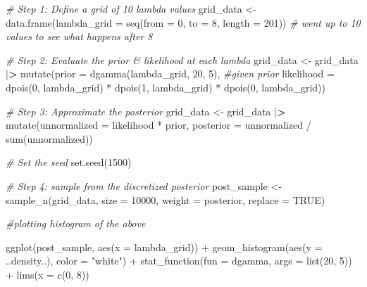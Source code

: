 \documentclass[
]{article}
\newenvironment{Shaded}{\begin{snugshade}}{\end{snugshade}}
\newcommand{\AttributeTok}[1]{\textcolor[rgb]{0.77,0.63,0.00}{#1}}
\newcommand{\CommentTok}[1]{\textcolor[rgb]{0.56,0.35,0.01}{\textit{#1}}}
\newcommand{\ConstantTok}[1]{\textcolor[rgb]{0.00,0.00,0.00}{#1}}
\newcommand{\DecValTok}[1]{\textcolor[rgb]{0.00,0.00,0.81}{#1}}
\newcommand{\ErrorTok}[1]{\textcolor[rgb]{0.64,0.00,0.00}{\textbf{#1}}}
\newcommand{\FunctionTok}[1]{\textcolor[rgb]{0.00,0.00,0.00}{#1}}
\newcommand{\NormalTok}[1]{#1}
\newcommand{\OtherTok}[1]{\textcolor[rgb]{0.56,0.35,0.01}{#1}}
\newcommand{\SpecialCharTok}[1]{\textcolor[rgb]{0.00,0.00,0.00}{#1}}
\newcommand{\StringTok}[1]{\textcolor[rgb]{0.31,0.60,0.02}{#1}}
\begin{document}
\begin{Shaded}
\begin{Highlighting}[]
\CommentTok{\# Step 1: Define a grid of 10 lambda values}
\NormalTok{grid\_data   }\OtherTok{\textless{}{-}} \FunctionTok{data.frame}\NormalTok{(}\AttributeTok{lambda\_grid =} \FunctionTok{seq}\NormalTok{(}\AttributeTok{from =} \DecValTok{0}\NormalTok{, }\AttributeTok{to =} \DecValTok{8}\NormalTok{, }\AttributeTok{length =} \DecValTok{201}\NormalTok{)) }\CommentTok{\# went up to 10 values to see what happens after 8}

\CommentTok{\# Step 2: Evaluate the prior \& likelihood at each lambda}
\NormalTok{grid\_data }\OtherTok{\textless{}{-}}\NormalTok{ grid\_data }\SpecialCharTok{|}\ErrorTok{\textgreater{}} 
  \FunctionTok{mutate}\NormalTok{(}\AttributeTok{prior =} \FunctionTok{dgamma}\NormalTok{(lambda\_grid, }\DecValTok{20}\NormalTok{, }\DecValTok{5}\NormalTok{), }\CommentTok{\#given prior}
         \AttributeTok{likelihood =} \FunctionTok{dpois}\NormalTok{(}\DecValTok{0}\NormalTok{, lambda\_grid) }\SpecialCharTok{*} \FunctionTok{dpois}\NormalTok{(}\DecValTok{1}\NormalTok{, lambda\_grid) }\SpecialCharTok{*} \FunctionTok{dpois}\NormalTok{(}\DecValTok{0}\NormalTok{, lambda\_grid))}

\CommentTok{\# Step 3: Approximate the posterior}
\NormalTok{grid\_data }\OtherTok{\textless{}{-}}\NormalTok{ grid\_data }\SpecialCharTok{|}\ErrorTok{\textgreater{}} 
  \FunctionTok{mutate}\NormalTok{(}\AttributeTok{unnormalized =}\NormalTok{ likelihood }\SpecialCharTok{*}\NormalTok{ prior,}
         \AttributeTok{posterior =}\NormalTok{ unnormalized }\SpecialCharTok{/} \FunctionTok{sum}\NormalTok{(unnormalized))}

\CommentTok{\# Set the seed}
\FunctionTok{set.seed}\NormalTok{(}\DecValTok{1500}\NormalTok{)}

\CommentTok{\# Step 4: sample from the discretized posterior}
\NormalTok{post\_sample }\OtherTok{\textless{}{-}} \FunctionTok{sample\_n}\NormalTok{(grid\_data, }\AttributeTok{size =} \DecValTok{10000}\NormalTok{, }
                        \AttributeTok{weight =}\NormalTok{ posterior, }\AttributeTok{replace =} \ConstantTok{TRUE}\NormalTok{)}

\CommentTok{\#plotting histogram of the above }

\FunctionTok{ggplot}\NormalTok{(post\_sample, }\FunctionTok{aes}\NormalTok{(}\AttributeTok{x =}\NormalTok{ lambda\_grid)) }\SpecialCharTok{+} 
  \FunctionTok{geom\_histogram}\NormalTok{(}\FunctionTok{aes}\NormalTok{(}\AttributeTok{y =}\NormalTok{ ..density..), }\AttributeTok{color =} \StringTok{"white"}\NormalTok{) }\SpecialCharTok{+} 
  \FunctionTok{stat\_function}\NormalTok{(}\AttributeTok{fun =}\NormalTok{ dgamma, }\AttributeTok{args =} \FunctionTok{list}\NormalTok{(}\DecValTok{20}\NormalTok{, }\DecValTok{5}\NormalTok{)) }\SpecialCharTok{+} 
  \FunctionTok{lims}\NormalTok{(}\AttributeTok{x =} \FunctionTok{c}\NormalTok{(}\DecValTok{0}\NormalTok{, }\DecValTok{8}\NormalTok{))}
\end{Highlighting}
\end{Shaded}
\end{document}
